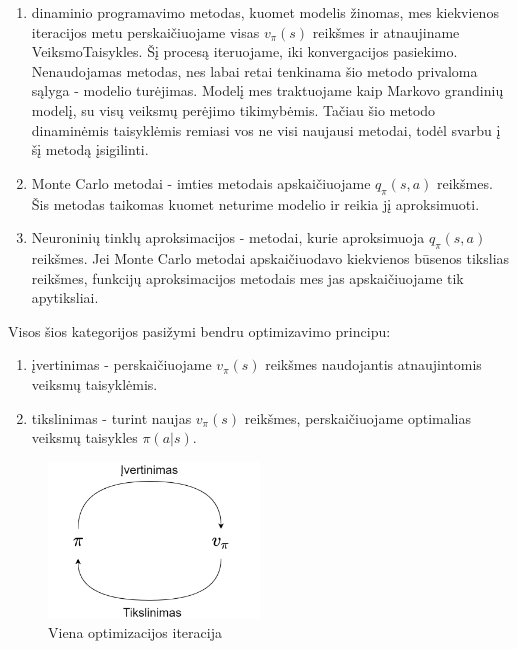 \documentclass[a4paper, 12pt]{article}
\begin{document}
\begin{enumerate}
  \addtolength{\itemsep}{-0.5\baselineskip} 
  \item dinaminio programavimo metodas, kuomet modelis žinomas, mes kiekvienos iteracijos metu perskaičiuojame visas $v_{\pi}(s)$ reikšmes ir atnaujiname \gls{VeiksmoTaisykles}. Šį procesą iteruojame, iki konvergacijos pasiekimo. Nenaudojamas metodas, nes labai retai tenkinama šio metodo privaloma sąlyga - modelio turėjimas. Modelį mes traktuojame kaip Markovo grandinių modelį, su visų veiksmų perėjimo tikimybėmis. Tačiau šio metodo dinaminėmis taisyklėmis remiasi vos ne visi naujausi metodai, todėl svarbu į šį metodą įsigilinti.
  \item Monte Carlo metodai - imties metodais apskaičiuojame $q_{\pi}(s, a)$ reikšmes. Šis metodas taikomas kuomet neturime modelio ir reikia jį aproksimuoti. 
  \item Neuroninių tinklų aproksimacijos - metodai, kurie aproksimuoja $q_{\pi}(s, a)$ reikšmes. Jei Monte Carlo metodai apskaičiuodavo kiekvienos būsenos tikslias reikšmes, funkcijų aproksimacijos metodais mes jas apskaičiuojame tik apytiksliai.
\end{enumerate}

Visos šios kategorijos pasižymi bendru optimizavimo principu:

\begin{enumerate}
  \addtolength{\itemsep}{-0.5\baselineskip} 
  \item įvertinimas - perskaičiuojame $v_{\pi}(s)$ reikšmes naudojantis atnaujintomis veiksmų taisyklėmis.
  \item tikslinimas - turint naujas $v_{\pi}(s)$ reikšmes, perskaičiuojame optimalias veiksmų taisykles $\pi(a|s)$.
\end{enumerate}

\begin{figure}[h]
\centering
\includegraphics[width=0.5\textwidth]{policyIteration}
\caption{Viena optimizacijos iteracija }
\label{policyIteration}
\end{figure}
\end{document}
